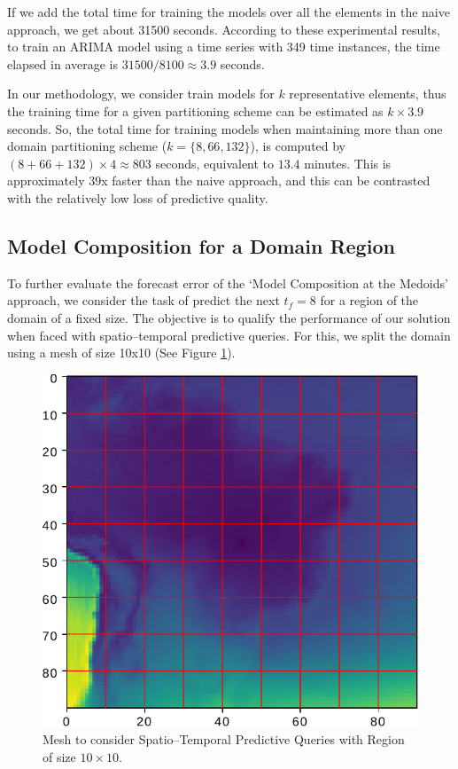 If we add the total time for training the models over all the elements in the naive approach, we get about 31500 seconds. According to these experimental results, to train an ARIMA model using a time series with 349 time instances, the time elapsed in average is $31500 / 8100 \approx 3.9$ seconds. 

In our methodology, we consider train models for $k$ representative elements, thus the training time for a given partitioning scheme can be estimated as $k \times 3.9$ seconds. So, the total time for training models when maintaining more than one domain partitioning scheme ($k = \{8, 66, 132\}$), is computed by $(8 + 66  + 132) \times 4 \approx 803$ seconds, equivalent to $13.4$ minutes. This is approximately $39$x faster than the naive approach, and this can be contrasted with the relatively low loss of predictive quality.

\subsection{Model Composition for a Domain Region}
\label{Sec:ModelCompositionAggregated}

To further evaluate the forecast error of the `Model Composition at the Medoids’ approach, we consider the task of predict the next $t_{f}=8$ for a region of the domain of a fixed size. The objective is to qualify the performance of our solution when faced with spatio--temporal predictive queries. For this, we split the domain using a mesh of size 10x10 (See Figure \ref{Fig:Query_10x10_whole_real_brazil}).

\begin{figure}[h]
	\centering
	\includegraphics[scale=0.75]{../Figures/query_10x10_whole_real_brazil}
	\caption{Mesh to consider Spatio--Temporal Predictive Queries with Region of size $10 \times 10$.}
	\label{Fig:Query_10x10_whole_real_brazil}
\end{figure}

